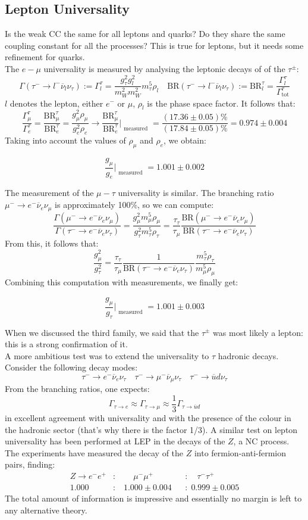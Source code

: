 \documentclass[10.75pt,a4paper,openright,bottom=2cm]{article}
\newcommand{\beginbox}[1]{\begin{tcolorbox}[width=\textwidth,colback={yellow!50},title={#1},colbacktitle={gray!50},coltitle=black]}
\renewcommand{\endbox}{\end{tcolorbox}\noindent}
\begin{document}
\subsection{Lepton Universality}
Is the weak CC the same for all leptons and quarks? Do they share the same coupling constant for all the processes? This is true for leptons, but it needs some refinement for quarks.\\
The $e-\mu$ universality is measured by analysing the leptonic decays of of the $\tau^\pm$:
\[
\Gamma(\tau^-\to l^-\overline{\nu}_l\nu_\tau):=\Gamma_l^\tau=\frac{g_\tau^2g_l^2}{m_W^2m_W^2}m_\tau^5\rho_l \quad \text{BR}(\tau^-\to l^-\overline{\nu}_l\nu_\tau):=\text{BR}^\tau_l=\frac{\Gamma_l^\tau}{\Gamma^\tau_{\text{tot}}}
\]
$l$ denotes the lepton, either $e^-$ or $\mu$, $\rho_l$ is the phase space factor. It follows that:
\[
\frac{\Gamma_\mu^\tau}{\Gamma_e^\tau}=\frac{\text{BR}_\mu^\tau}{\text{BR}_e^\tau}=\frac{g_\mu^2\rho_\mu}{g_e^2\rho_e}\to\frac{\text{BR}_\mu^\tau}{\text{BR}_e^\tau}\Bigr|_{\substack{\text{measured}}}=\frac{(17.36\pm0.05)\%}{(17.84\pm0.05)\%}=0.974\pm0.004
\]
Taking into account the values of $\rho_\mu$ and $\rho_e$, we obtain:
\beginbox{Electron-Muon Universality}
\[
\frac{g_\mu}{g_e}\Bigr|_{\substack{\text{measured}}}=1.001\pm0.002
\]
\endbox
The measurement of the $\mu-\tau$ universality is similar. The branching ratio $\mu^-\to e^-\overline{\nu}_e\nu_\mu$ is approximately 100\%, so we can compute:
\[
\frac{\Gamma(\mu^-\to e^-\overline{\nu}_e\nu_\mu)}{\Gamma(\tau^-\to e^-\overline{\nu}_e\nu_\tau)}=\frac{g_\mu^2m_\mu^5\rho_\mu}{g_\tau^2m_\tau^5\rho_\tau}=\frac{\tau_\tau}{\tau_\mu}\frac{\text{BR}(\mu^-\to e^-\overline{\nu}_e\nu_\mu)}{\text{BR}(\tau^-\to e^-\overline{\nu}_e\nu_\tau)}
\]
From this, it follows that:
\[
\frac{g_\mu^2}{g_\tau^2}=\frac{\tau_\tau}{\tau_\mu}\frac{1}{\text{BR}(\tau^-\to e^-\overline{\nu}_e\nu_\tau)}\frac{m_\tau^5\rho_\tau}{m_\mu^5\rho_\mu}
\]
Combining this computation with measurements, we finally get:
\beginbox{Muon-Tau Universality}
\[
\frac{g_\mu}{g_\tau}\Bigr|_{\substack{\text{measured}}}=1.001\pm0.003
\]
\endbox
When we discussed the third family, we said that the $\tau^\pm$ was most likely a lepton: this is a strong confirmation of it.\\
A more ambitious test was to extend the universality to $\tau$ hadronic decays. Consider the following decay modes:
\[
\tau^-\to e^-\overline{\nu}_e\nu_\tau \quad \tau^-\to\mu^-\overline{\nu}_\mu\nu_\tau \quad \tau^-\to\overline{u}d\nu_\tau
\]
From the branching ratios, one expects:
\[
\Gamma_{\tau\to e}\approx\Gamma_{\tau\to\mu}\approx\frac{1}{3}\Gamma_{\tau\to\overline{u}d}
\]
in excellent agreement with universality and with the presence of the colour in the hadronic sector (that's why there is the factor 1/3). A similar test on lepton universality has been performed at LEP in the decays of the $Z$, a NC process. The experiments have measured the decay of the $Z$ into fermion-anti-fermion pairs, finding:
\[
\begin{aligned}
Z\to e^-e^+&:\qquad\mu^-\mu^+&&:\quad\tau^-\tau^+\\
1.000&:\;\;\;1.000\pm0.004&&:\;0.999\pm0.005
\end{aligned}
\]
The total amount of information is impressive and essentially no margin is left to any alternative theory.
\end{document}
